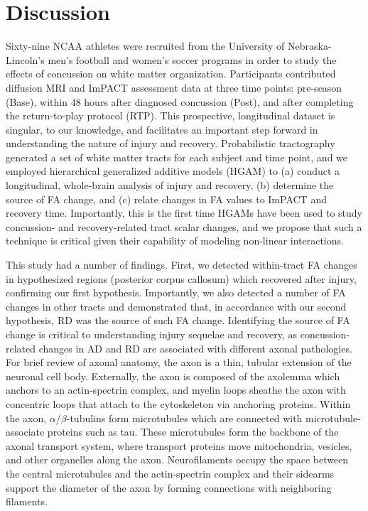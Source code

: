 \documentclass[12pt]{article}
\begin{document}
\section{Discussion}
\label{sec:disc}
Sixty-nine NCAA athletes were recruited from the University of Nebraska-Lincoln's men's football and women's soccer programs in order to study the effects of concussion on white matter organization. Participants contributed diffusion MRI and ImPACT assessment data at three time points: pre-season (Base), within 48 hours after diagnosed concussion (Post), and after completing the return-to-play protocol (RTP). This prospective, longitudinal dataset is singular, to our knowledge, and facilitates an important step forward in understanding the nature of injury and recovery. Probabilistic tractography generated a set of white matter tracts for each subject and time point, and we employed hierarchical generalized additive models (HGAM) to (a) conduct a longitudinal, whole-brain analysis of injury and recovery, (b) determine the source of FA change, and (c) relate changes in FA values to ImPACT and recovery time. Importantly, this is the first time HGAMs have been used to study concussion- and recovery-related tract scalar changes, and we propose that such a technique is critical given their capability of modeling non-linear interactions.

This study had a number of findings. First, we detected within-tract FA changes in hypothesized regions (posterior corpus callosum) which recovered after injury, confirming our first hypothesis. Importantly, we also detected a number of FA changes in other tracts and demonstrated that, in accordance with our second hypothesis, RD was the source of such FA change. Identifying the source of FA change is critical to understanding injury sequelae and recovery, as concussion-related changes in AD and RD are associated with different axonal pathologies. For brief review of axonal anatomy, the axon is a thin, tubular extension of the neuronal cell body. Externally, the axon is composed of the axolemma which anchors to an actin-spectrin complex, and myelin loops sheathe the axon with concentric loops that attach to the cytoskeleton via anchoring proteins. Within the axon, $\alpha$/$\beta$-tubulins form microtubules which are connected with microtubule-associate proteins such as tau. These microtubules form the backbone of the axonal transport system, where transport proteins move mitochondria, vesicles, and other organelles along the axon. Neurofilaments occupy the space between the central microtubules and the actin-spectrin complex and their sidearms support the diameter of the axon by forming connections with neighboring filaments.
\end{document}
